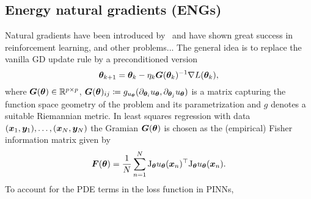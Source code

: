 \subsection{Energy natural gradients (ENGs)}


Natural gradients have been introduced by~\citet{amari1998natural} and have shown great success in reinforcement learning, and other problems...
The general idea is to replace the vanilla GD update rule by a preconditioned version
    \[ {\bm{\theta}}_{k+1} = {\bm{\theta}}_k - \eta_k {\bm{G}}({\bm{\theta}}_k)^{-1} \nabla L({\bm{\theta}}_k), \]
where ${\bm{G}}({\bm{\theta}})\in\mathbb R^{p\times p}$, ${\bm{G}}({\bm{\theta}})_{ij} \coloneqq g_{u_{\bm{\theta}}}(\partial_{{\bm{\theta}}_i} u_{\bm{\theta}}, \partial_{{\bm{\theta}}_j} u_{\bm{\theta}})$ is a matrix capturing the function space geometry of the problem and its parametrization and $g$ denotes a suitable Riemannian metric. 
In least squares regression with data $({\bm{x}}_1, {\bm{y}}_1), \dots, ({\bm{x}}_N, {\bm{y}}_N)$ the Gramian ${\bm{G}}({\bm{\theta}})$ is chosen as the (empirical) Fisher information matrix given by~\citep{martens2020new, eschenhagen2023kroneckerfactored} 
\begin{equation}
  {\bm{F}}({\bm{\theta}}) = \frac1N\sum_{n=1}^N \mathrm{J}_{{\bm{\theta}}} u_{{\bm{\theta}}}({\bm{x}}_n)^\top \mathrm{J}_{{\bm{\theta}}} u_{{\bm{\theta}}}({\bm{x}}_n)
  .
\end{equation}
To account for the PDE terms in the loss function in PINNs, 
